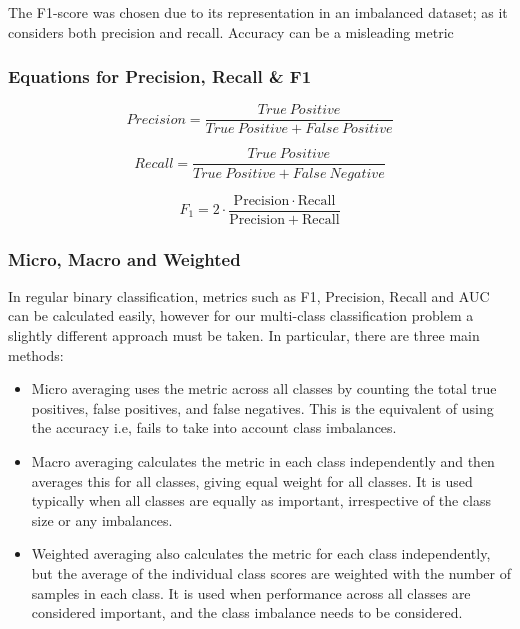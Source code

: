 The F1-score was chosen due to its representation in an imbalanced dataset; as it considers both precision and recall. Accuracy can be a misleading metric %

\subsubsection*{Equations for Precision, Recall \& F1} 

\begin{equation*} Precision = \frac{True\ Positive}{True\ Positive + False\ Positive} \end{equation*}

\begin{equation*} Recall = \frac{True\ Positive}{True\ Positive + False\ Negative} \end{equation*}

\begin{equation*}
F_1 = 2 \cdot \frac{\mathrm{Precision} \cdot \mathrm{Recall}}{\mathrm{Precision} + \mathrm{Recall}}
\end{equation*}

\subsubsection*{Micro, Macro and Weighted}

In regular binary classification, metrics such as F1, Precision, Recall and AUC can be calculated easily, however for our multi-class classification problem a slightly different approach must be taken. In particular, there are three main methods:

\begin{itemize}
    \item Micro averaging uses the metric across all classes by counting the total true positives, false positives, and false negatives. This is the equivalent of using the accuracy i.e, fails to take into account class imbalances.
    \item Macro averaging calculates the metric in each class independently and then averages this for all classes, giving equal weight for all classes. It is used typically when all classes are equally as important, irrespective of the class size or any imbalances.
    \item Weighted averaging also calculates the metric for each class independently, but the average of the individual class scores are weighted with the number of samples in each class. It is used when performance across all classes are considered important, and the class imbalance needs to be considered.
\end{itemize}


